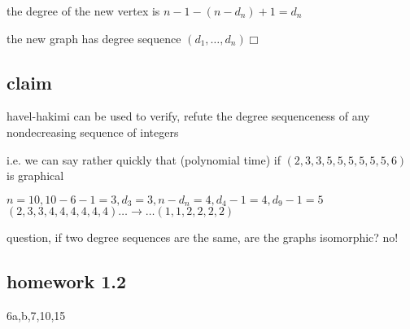 \documentclass[letterpaper]{article}
\begin{document}
the degree of the new vertex is $n-1-(n-d_n)+1=d_n$

the new graph has degree sequence $(d_1,\dots,d_n)\Box$

\subsection*{claim}
havel-hakimi can be used to verify, refute the degree sequenceness of any nondecreasing sequence of integers

i.e. we can say rather quickly that (polynomial time) if $(2,3,3,5,5,5,5,5,5,6)$ is graphical 

$n=10, 10-6-1=3, d_3=3, n-d_n=4,d_4-1=4,d_9-1=5$
$(2,3,3,4,4,4,4,4,4)\dots\to\dots (1,1,2,2,2,2)$

question, if two degree sequences are the same, are the graphs isomorphic? no!

\subsection*{homework 1.2}
6a,b,7,10,15
\end{document}
